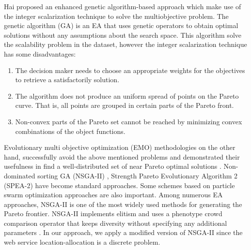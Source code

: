 \documentclass[twoside]{article}
\begin{document}
Hai \cite{EnhancedGenetic} proposed an enhanced genetic algorithm-based approach which make use of the integer scalarization technique to solve the multiobjective problem.
The genetic algorithm (GA) is an EA that uses genetic operators to obtain optimal solutions without any assumptions about the search space.
This algorithm solve the scalability problem in the dataset, however the integer scalarization technique \cite{Multiobjective} has some disadvantages: 

\begin{enumerate}
	\item The decision maker needs to choose an appropriate weights for the objectives to retrieve a satisfactorily solution.
	\item The algorithm does not produce an uniform spread of points on the Pareto curve. That is, all points are grouped in certain parts of the Pareto front.
	\item Non-convex parts of the Pareto set cannot be reached by minimizing convex combinations of the object functions.
\end{enumerate}

Evolutionary multi objective optimization (EMO) methodologies on the other hand, successfully avoid the above mentioned problems and demonstrated their usefulness in find a well-distributed set of near Pareto optimal solutions \cite{Aboolian200964}. Non-dominated sorting GA (NSGA-II) \cite{996017}, Strength Pareto Evolutionary Algorithm 2 (SPEA-2) \cite{Deb:2005:EED:1109044.1109049} have become standard approaches. 
Some schemes based on particle swarm optimization approaches \cite{Elhossini:2010:SPP:1739146.1739151, Huang:2006:CLP:1108677.1108683} are also important. 
Among numerous EA approaches, NSGA-II is one of the most widely used methods for generating the Pareto frontier. 
NSGA-II implements elitism and uses a phenotype crowd comparison operator that keeps diversity without specifying any additional parameters \cite{Deb06referencepoint}.
In our approach, we apply a modified version of NSGA-II since the web service location-allocation is a discrete problem. 
\end{document}
